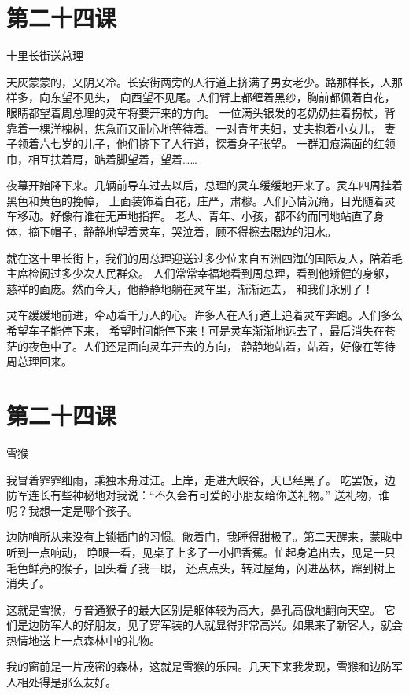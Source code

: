 \documentclass[12pt,UTF8]{ctexbook}
\begin{document}
\section{第二十四课}

十里长街送总理

天灰蒙蒙的，又阴又冷。长安街两旁的人行道上挤满了男女老少。路那样长，人那样多，向东望不见头，
向西望不见尾。人们臂上都缠着黑纱，胸前都佩着白花，眼睛都望着周总理的灵车将要开来的方向。
一位满头银发的老奶奶拄着拐杖，背靠着一棵洋槐树，焦急而又耐心地等待着。一对青年夫妇，丈夫抱着小女儿，
妻子领着六七岁的儿子，他们挤下了人行道，探着身子张望。
一群泪痕满面的红领巾，相互扶着肩，踮着脚望着，望着……

夜幕开始降下来。几辆前导车过去以后，总理的灵车缓缓地开来了。灵车四周挂着黑色和黄色的挽幛，
上面装饰着白花，庄严，肃穆。人们心情沉痛，目光随着灵车移动。好像有谁在无声地指挥。
老人、青年、小孩，都不约而同地站直了身体，摘下帽子，静静地望着灵车，哭泣着，顾不得擦去腮边的泪水。

就在这十里长街上，我们的周总理迎送过多少位来自五洲四海的国际友人，陪着毛主席检阅过多少次人民群众。
人们常常幸福地看到周总理，看到他矫健的身躯，慈祥的面庞。然而今天，他静静地躺在灵车里，渐渐远去，
和我们永别了！

灵车缓缓地前进，牵动着千万人的心。许多人在人行道上追着灵车奔跑。人们多么希望车子能停下来，
希望时间能停下来！可是灵车渐渐地远去了，最后消失在苍茫的夜色中了。人们还是面向灵车开去的方向，
静静地站着，站着，好像在等待周总理回来。

\section{第二十四课}

雪猴

我冒着霏霏细雨，乘独木舟过江。上岸，走进大峡谷，天已经黑了。
吃罢饭，边防军连长有些神秘地对我说：“不久会有可爱的小朋友给你送礼物。”
送礼物，谁呢？我想一定是哪个孩子。

边防哨所从来没有上锁插门的习惯。敞着门，我睡得甜极了。第二天醒来，蒙眬中听到一点响动，
睁眼一看，见桌子上多了一小把香蕉。忙起身追出去，见是一只毛色鲜亮的猴子，回头看了我一眼，
还点点头，转过屋角，闪进丛林，蹿到树上消失了。

这就是雪猴，与普通猴子的最大区别是躯体较为高大，鼻孔高傲地翻向天空。
它们是边防军人的好朋友，见了穿军装的人就显得非常高兴。如果来了新客人，就会热情地送上一点森林中的礼物。

我的窗前是一片茂密的森林，这就是雪猴的乐园。几天下来我发现，雪猴和边防军人相处得是那么友好。
\end{document}
